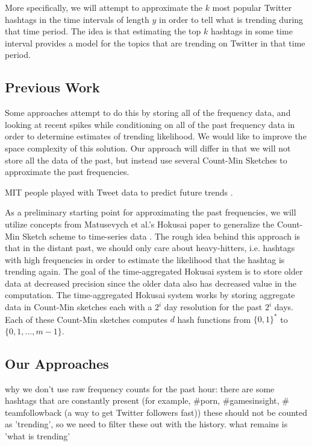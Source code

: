 \documentclass[twoside]{article}
\newcommand{\cc}[1]
 {\textbf{\cite{#1}}}
\begin{document}
More specifically, we will attempt to approximate the $k$ most popular Twitter hashtags in the time intervals of length $y$ in order to tell what is trending during that time period.
The idea is that estimating the top $k$ hashtags in some time interval provides a model for the topics that are trending on Twitter in that time period.


\subsection{Previous Work} \label{sec:PreviousWork}


Some approaches attempt to do this by storing all of the frequency data, and looking at recent spikes while conditioning on all of the past frequency data in order to determine estimates of trending likelihood. We would like to improve the space complexity of this solution. Our approach will differ in that we will not store all the data of the past, but instead use several Count-Min Sketches to approximate the past frequencies. 

MIT people played with Tweet data to predict future trends \cc{MITNews2012}. 

As a preliminary starting point for approximating the past frequencies, we will utilize concepts from Matusevych et al.'s Hokusai paper to generalize the Count-Min Sketch scheme to time-series data \cc{Matusevych:2012}. The rough idea behind this approach is that in the distant past, we should only care about heavy-hitters, i.e. hashtags with high frequencies in order to estimate the likelihood that the hashtag is trending again.
The goal of the time-aggregated Hokusai system is to store older data at decreased precision since the older data also has decreased value in the computation.  The time-aggregated Hokusai system works by storing aggregate data in Count-Min sketches each with a $2^i$ day resolution for the past $2^i$ days.  Each of these Count-Min sketches computes $d$ hash functions from $\{0,1\}^*$ to $\{0, 1, ..., m-1\}$.


\subsection{Our Approaches}

why we don't use raw frequency counts for the past hour:
there are some hashtags that are constantly present (for example, $\#$porn, $\#$gamesinsight, $\#$teamfollowback (a way to get Twitter followers fast))
these should not be counted as 'trending', so we need to filter these out
with the history. what remains is 'what is trending'
\end{document}
